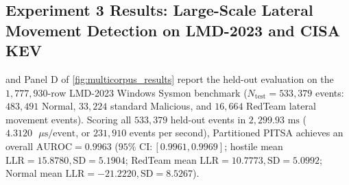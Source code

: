 \documentclass[11pt,a4paper]{article}
\begin{document}
\subsection{Experiment 3 Results: Large-Scale Lateral Movement Detection on LMD-2023 and CISA KEV}
\label{subsec:res_exp3}

 and Panel D of \cref{fig:multicorpus_results} report the held-out evaluation on the $1,777,930$-row LMD-2023 Windows Sysmon benchmark ($N_{\text{test}} = 533,379$ events: $483,491$ Normal, $33,224$ standard Malicious, and $16,664$ RedTeam lateral movement events). Scoring all $533,379$ held-out events in $2,299.93\text{ ms}$ ($4.3120\text{ }\mu\text{s/event}$, or $231,910$ events per second), Partitioned PITSA achieves an overall $\text{AUROC} = 0.9963$ ($95\%\text{ CI}: [0.9961, 0.9969]$; hostile mean $\text{LLR} = 15.8780, \text{SD} = 5.1904$; RedTeam mean $\text{LLR} = 10.7773, \text{SD} = 5.0992$; Normal mean $\text{LLR} = -21.2220, \text{SD} = 8.5267$).
\end{document}
